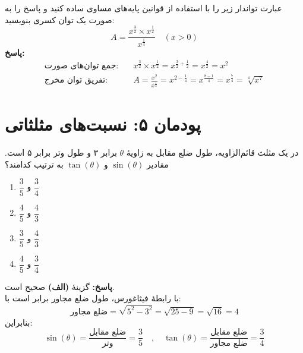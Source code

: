 \documentclass[a4paper,12pt]{article}
\begin{document}
\begin{tcolorbox}[title=\textbf{سؤال ۱۲ (تشریحی)}]
عبارت تواندار زیر را با استفاده از قوانین پایه‌های مساوی ساده کنید و پاسخ را به صورت یک توان کسری بنویسید:
\[ A = \frac{x^{\frac{3}{2}} \times x^{\frac{1}{2}}}{x^{\frac{1}{4}}} \quad (x > 0) \]
\textbf{پاسخ:}
\begin{align*}
\text{جمع توان‌های صورت:} \quad & x^{\frac{3}{2}} \times x^{\frac{1}{2}} = x^{\frac{3}{2} + \frac{1}{2}} = x^{\frac{4}{2}} = x^2 \\
\text{تفریق توان مخرج:} \quad & A = \frac{x^2}{x^{\frac{1}{4}}} = x^{2 - \frac{1}{4}} = x^{\frac{8 - 1}{4}} = x^{\frac{7}{4}} = \sqrt[4]{x^7}
\end{align*}
\end{tcolorbox}

\newpage

\section*{پودمان ۵: نسبت‌های مثلثاتی}

\begin{tcolorbox}[title=\textbf{سؤال ۱۳ (تستی)}]
در یک مثلث قائم‌الزاویه، طول ضلع مقابل به زاویۀ $\theta$ برابر ۳ و طول وتر برابر ۵ است. مقادیر $\sin(\theta)$ و $\tan(\theta)$ به ترتیب کدامند؟
\begin{enumerate}[label=\textbf{(\alph*)}]
    \item $\dfrac{3}{5}$ و $\dfrac{3}{4}$
    \item $\dfrac{4}{5}$ و $\dfrac{4}{3}$
    \item $\dfrac{3}{5}$ و $\dfrac{4}{3}$
    \item $\dfrac{4}{5}$ و $\dfrac{3}{4}$
\end{enumerate}
\textbf{پاسخ:} گزینۀ \textbf{(الف)} صحیح است.
\\
با رابطۀ فیثاغورس، طول ضلع مجاور برابر است با:
\[ \text{ضلع مجاور} = \sqrt{5^2 - 3^2} = \sqrt{25 - 9} = \sqrt{16} = 4 \]
بنابراین:
\[ \sin(\theta) = \frac{\text{ضلع مقابل}}{\text{وتر}} = \frac{3}{5} \quad , \quad \tan(\theta) = \frac{\text{ضلع مقابل}}{\text{ضلع مجاور}} = \frac{3}{4} \]
\end{tcolorbox}
\end{document}
